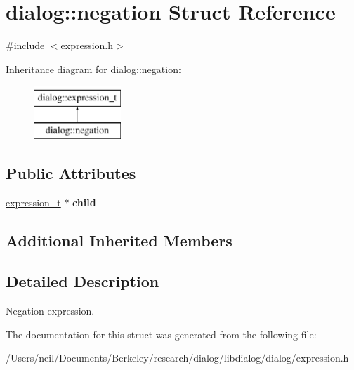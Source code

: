 \hypertarget{structdialog_1_1negation}{}\section{dialog\+:\+:negation Struct Reference}
\label{structdialog_1_1negation}


{\ttfamily \#include $<$expression.\+h$>$}

Inheritance diagram for dialog\+:\+:negation\+:\begin{figure}[H]
\begin{center}
\leavevmode
\includegraphics[height=2.000000cm]{structdialog_1_1negation}
\end{center}
\end{figure}
\subsection*{Public Attributes}
\begin{DoxyCompactItemize}
\item 
\mbox{\label{structdialog_1_1negation_a8a0b4d4dcf4c1f90808f9fce30ab5b73}} 
\hyperlink{structdialog_1_1expression__t}{expression\+\_\+t} $\ast$ {\bfseries child}
\end{DoxyCompactItemize}
\subsection*{Additional Inherited Members}


\subsection{Detailed Description}
Negation expression. 

The documentation for this struct was generated from the following file\+:\begin{DoxyCompactItemize}
\item 
/\+Users/neil/\+Documents/\+Berkeley/research/dialog/libdialog/dialog/expression.\+h\end{DoxyCompactItemize}
